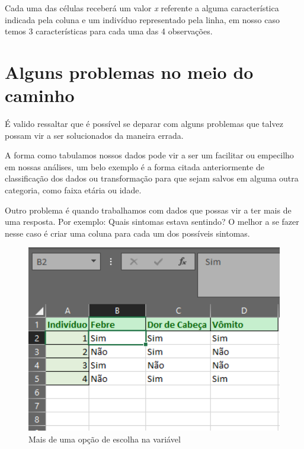 \documentclass[
  letterpaper,
  DIV=11,
  numbers=noendperiod]{scrreprt}
\begin{document}
Cada uma das células receberá um valor \emph{x} referente a alguma
característica indicada pela coluna e um indivíduo representado pela
linha, em nosso caso temos 3 características para cada uma das 4
observações.

\hypertarget{alguns-problemas-no-meio-do-caminho}{%
\section{Alguns problemas no meio do
caminho}\label{alguns-problemas-no-meio-do-caminho}}

É valido ressaltar que é possível se deparar com alguns problemas que
talvez possam vir a ser solucionados da maneira errada.

A forma como tabulamos nossos dados pode vir a ser um facilitar ou
empecilho em nossas análises, um belo exemplo é a forma citada
anteriormente de classificação dos dados ou transformação para que sejam
salvos em alguma outra categoria, como faixa etária ou idade.

Outro problema é quando trabalhamos com dados que possas vir a ter mais
de uma resposta. Por exemplo: Quais sintomas estava sentindo? O melhor a
se fazer nesse caso é criar uma coluna para cada um dos possíveis
sintomas.

\begin{figure}

{\centering \includegraphics[width=1\textwidth,height=\textheight]{./figuras_tabulacao/excel2.png}

}

\caption{Mais de uma opção de escolha na variável}

\end{figure}
\end{document}
